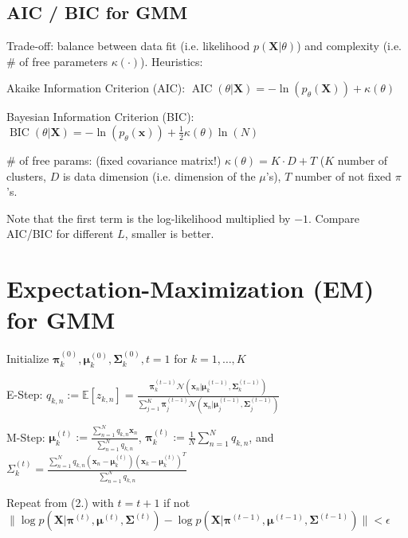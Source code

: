 \documentclass[a4paper, 11pt, landscape]{article}
\begin{document}
\begin{multicols*}{3}
\subsection{AIC / BIC for GMM}
Trade-off: balance between data fit (i.e. likelihood $p(\mathbf{X} | \theta)$) and complexity (i.e. \# of free parameters $\kappa(\cdot)$). Heuristics:
\begin{compactdesc}
	\item[Akaike Information Criterion (AIC):] $\operatorname{AIC}(\theta | \mathbf{X}) = -\ln(p_\theta(\mathbf{X})) + \kappa(\theta)$
	\item[Bayesian Information Criterion (BIC):] $\operatorname{BIC}(\theta | \mathbf{X}) = -\ln(p_\theta(\mathbf{x})) + \frac{1}{2} \kappa(\theta) \ln(N)$
	\item[\# of free params:] (fixed covariance matrix!) $\kappa(\theta) = K \cdot D + T$ ($K$ number of clusters, $D$ is data dimension (i.e. dimension of the $\mu$'s), $T$ number of not fixed $\pi$'s.
\end{compactdesc}
Note that the first term is the log-likelihood multiplied by $-1$. Compare AIC/BIC for different $L$, smaller is better.


\section{Expectation-Maximization (EM) for GMM}
\begin{compactenum}
	\item Initialize $\boldsymbol{\pi}_k^{(0)}, \boldsymbol{\mu}_k^{(0)}, \boldsymbol{\Sigma}_k^{(0)}, t = 1$ for $k = 1, \ldots, K$
	\item E-Step: $q_{k,n} := \mathbb{E}[z_{k,n}] = \frac{\boldsymbol{\pi}_k^{(t-1)} \mathcal{N}(\mathbf{x}_n | \boldsymbol{\mu}_k^{(t-1)}, \boldsymbol{\Sigma}_k^{(t-1)})}{\sum_{j=1}^K \boldsymbol{\pi}_j^{(t-1)} \mathcal{N}(\mathbf{x}_n | \boldsymbol{\mu}_j^{(t-1)}, \boldsymbol{\Sigma}_j^{(t-1)})}$
	\item M-Step: $\boldsymbol{\mu}_k^{(t)} := \frac{\sum_{n=1}^N q_{k,n} \mathbf{x}_n}{\sum_{n=1}^N q_{k,n}}$, $\boldsymbol{\pi}_k^{(t)} := \frac{1}{N} \sum_{n=1}^N q_{k,n}$, and $\Sigma_k^{(t)} = \frac{\sum_{n=1}^N q_{k, n} (\mathbf{x}_n - \boldsymbol{\mu}_k^{(t)})(\mathbf{x}_k - \boldsymbol{\mu}_k^{(t)})^T}{\sum_{n=1}^N q_{k,n}}$
	\item Repeat from (2.) with $t = t + 1$ if not $\| \log p(\mathbf{X} | \boldsymbol{\pi}^{(t)}, \boldsymbol{\mu}^{(t)}, \boldsymbol{\Sigma}^{(t)}) - \log p(\mathbf{X} | \boldsymbol{\pi}^{(t-1)}, \boldsymbol{\mu}^{(t-1)}, \boldsymbol{\Sigma}^{(t-1)}) \| < \epsilon$
\end{compactenum}



\end{multicols*}
\end{document}
